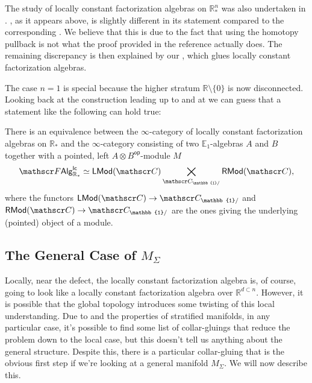 \documentclass[../text]{subfiles}
\begin{document}
\begin{remark}
    The study of locally constant factorization algebras on $\mathbb{R}^n_*$ was also undertaken in \cite[sec.6.3]{ginot2015}. , as it appears above, is slightly different in its statement compared to the corresponding \cite[cor.8]{ginot2015}. We believe that this is due to the fact that using the homotopy pullback is not what the proof provided in the reference actually does. The remaining discrepancy is then explained by our , which glues locally constant factorization algebras.
\end{remark}

\begin{remark}
    The case $n=1$ is special because the higher stratum $\mathbb{R} \setminus \{0\}$ is now disconnected. Looking back at the construction leading up to  and at  we can guess that a statement like the following can hold true:
\end{remark}

\begin{proposition}
    There is an equivalence between the $\infty$-category of locally constant factorization algebras on $\mathbb{R}_*$ and the $\infty$-category consisting of two $\mathbb{E}_1$-algebras $A$ and $B$ together with a pointed, left $A \otimes B^\mathsf{op}$-module $M$
    \begin{equation}
        \lcfa_{\mathbb{R}_*} \simeq \mathsf{LMod} (\catC) \bigtimes_{\catC_{\mathbb{1}/}} \mathsf{RMod} (\catC),
    \end{equation}
    where the functors $\mathsf{LMod}(\catC) \rightarrow \catC_{\mathbb{1}/}$ and $\mathsf{RMod}(\catC) \rightarrow \catC_{\mathbb{1}/}$ are the ones giving the underlying (pointed) object of a module.
\end{proposition}



\subsection{The General Case of \texorpdfstring{$M_{\Sigma}$}{M Sigma}}

Locally, near the defect, the locally constant factorization algebra is, of course, going to look like a locally constant factorization algebra over $\mathbb{R}^{d \subset n}$. However, it is possible that the global topology introduces some twisting of this local understanding. Due to  and the properties of stratified manifolds, in any particular case, it's possible to find some list of collar-gluings that reduce the problem down to the local case, but this doesn't tell us anything about the general structure. Despite this, there is a particular collar-gluing that is the obvious first step if we're looking at a general manifold $M_\Sigma$. We will now describe this.
\end{document}
